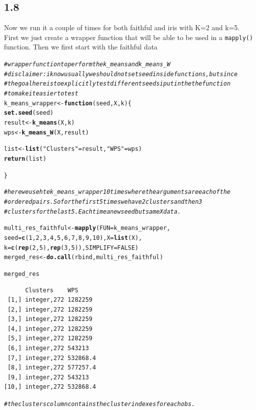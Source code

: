 \documentclass[10pt, a4paper, english]{article}\usepackage[]{graphicx}\usepackage[dvipsnames]{xcolor}
\makeatletter
\newcommand{\hlnum}[1]{\textcolor[rgb]{0.686,0.059,0.569}{#1}}%
\newcommand{\hlstr}[1]{\textcolor[rgb]{0.192,0.494,0.8}{#1}}%
\newcommand{\hlcom}[1]{\textcolor[rgb]{0.678,0.584,0.686}{\textit{#1}}}%
\newcommand{\hlstd}[1]{\textcolor[rgb]{0.345,0.345,0.345}{#1}}%
\newcommand{\hlkwa}[1]{\textcolor[rgb]{0.161,0.373,0.58}{\textbf{#1}}}%
\newcommand{\hlkwb}[1]{\textcolor[rgb]{0.69,0.353,0.396}{#1}}%
\newcommand{\hlkwc}[1]{\textcolor[rgb]{0.333,0.667,0.333}{#1}}%
\newcommand{\hlkwd}[1]{\textcolor[rgb]{0.737,0.353,0.396}{\textbf{#1}}}%
\newenvironment{kframe}{%
 \def\at@end@of@kframe{}%
 \ifinner\ifhmode%
  \def\at@end@of@kframe{\end{minipage}}%
  \begin{minipage}{\columnwidth}%
 \fi\fi%
 \def\FrameCommand##1{\hskip\@totalleftmargin \hskip-\fboxsep
 \colorbox{shadecolor}{##1}\hskip-\fboxsep
     \hskip-\linewidth \hskip-\@totalleftmargin \hskip\columnwidth}%
 \MakeFramed {\advance\hsize-\width
   \@totalleftmargin\z@ \linewidth\hsize
   \@setminipage}}%
 {\par\unskip\endMakeFramed%
 \at@end@of@kframe}
\newenvironment{knitrout}{}{} %
\makeatother
\begin{document}
\subsection{1.8}
Now we run it a couple of times for both faithful and iris with K=2 and k=5. 
First we just create a wrapper function that will be able to be used in a \texttt{mapply()} function. Then we first start with the faithful data
\begin{knitrout}
\color{fgcolor}\begin{kframe}
\begin{alltt}
\hlcom{#wrapper function to perform the k_means and k_means_W}
\hlcom{#disclaimer: i know usually we should not set seed inside functions, but since}
\hlcom{# the goal here is to explicitly test different seeds i put in the the function}
\hlcom{#to make it easier to test}
\hlstd{k_means_wrapper} \hlkwb{<-} \hlkwa{function}\hlstd{(}\hlkwc{seed}\hlstd{,} \hlkwc{X}\hlstd{,} \hlkwc{k} \hlstd{)\{}
  \hlkwd{set.seed}\hlstd{(seed)}
  \hlstd{result} \hlkwb{<-} \hlkwd{k_means}\hlstd{(X,k)}
  \hlstd{wps} \hlkwb{<-} \hlkwd{k_means_W}\hlstd{(X, result)}

  \hlstd{list} \hlkwb{<-} \hlkwd{list}\hlstd{(}\hlstr{"Clusters"} \hlstd{= result,} \hlstr{"WPS"} \hlstd{= wps)}
  \hlkwd{return}\hlstd{(list)}

\hlstd{\}}

\hlcom{#here we use hte k_means_wrapper 10 times where the arguments are each of the }
\hlcom{# ordered pairs. So for the first 5 times we have 2 clusters and then 3 }
\hlcom{# clusters for the last 5. Each time a new seed but same X data. }

\hlstd{multi_res_faithful} \hlkwb{<-} \hlkwd{mapply}\hlstd{(}\hlkwc{FUN}\hlstd{= k_means_wrapper,}
                             \hlkwc{seed}\hlstd{=}\hlkwd{c}\hlstd{(}\hlnum{1}\hlstd{,}\hlnum{2}\hlstd{,}\hlnum{3}\hlstd{,}\hlnum{4}\hlstd{,}\hlnum{5}\hlstd{,}\hlnum{6}\hlstd{,}\hlnum{7}\hlstd{,}\hlnum{8}\hlstd{,}\hlnum{9}\hlstd{,}\hlnum{10}\hlstd{),} \hlkwc{X}\hlstd{=}\hlkwd{list}\hlstd{(X),}
                            \hlkwc{k}\hlstd{=}\hlkwd{c}\hlstd{(}\hlkwd{rep}\hlstd{(}\hlnum{2}\hlstd{,}\hlnum{5}\hlstd{),} \hlkwd{rep}\hlstd{(}\hlnum{3}\hlstd{,}\hlnum{5}\hlstd{)),} \hlkwc{SIMPLIFY} \hlstd{=} \hlnum{FALSE}\hlstd{)}
\hlstd{merged_res} \hlkwb{<-} \hlkwd{do.call}\hlstd{(rbind, multi_res_faithful)}

\hlstd{merged_res}
\end{alltt}
\begin{verbatim}
      Clusters    WPS     
 [1,] integer,272 1282259 
 [2,] integer,272 1282259 
 [3,] integer,272 1282259 
 [4,] integer,272 1282259 
 [5,] integer,272 1282259 
 [6,] integer,272 543213  
 [7,] integer,272 532868.4
 [8,] integer,272 577257.4
 [9,] integer,272 543213  
[10,] integer,272 532868.4
\end{verbatim}
\begin{alltt}
\hlcom{#the clusters column contains the cluster indexes for each obs.}


\end{alltt}
\end{kframe}
\end{knitrout}
\end{document}

